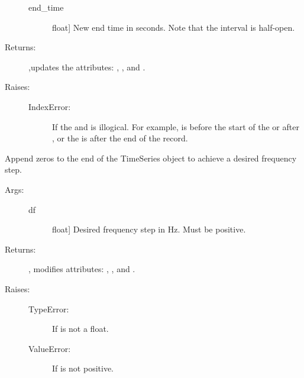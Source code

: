 \documentclass[letterpaper,10pt,english]{sphinxmanual}
\begin{document}
\begin{fulllineitems}
\begin{fulllineitems}
\begin{description}
\begin{description}
\item[{end\_time}] \leavevmode{[}float{]}
New end time in seconds. Note that the interval is
half-open.

\end{description}

\item[{Returns:}] \leavevmode
{},updates the attributes: , , and
.

\item[{Raises:}] \leavevmode\begin{description}
\item[{IndexError:}] \leavevmode
If the  and  is illogical.
For example,  is before the start of the
 or after , or the  is
after the end of the record.

\end{description}

\end{description}

\end{fulllineitems}


\begin{fulllineitems}
\label{\detokenize{index:sigpropy.TimeSeries.zero_pad}}
Append zeros to the end of the TimeSeries object to achieve a
desired frequency step.
\begin{description}
\item[{Args:}] \leavevmode\begin{description}
\item[{df}] \leavevmode{[}float{]}
Desired frequency step in Hz. Must be positive.

\end{description}

\item[{Returns:}] \leavevmode
{}, modifies attributes: , , and
.

\item[{Raises:}] \leavevmode\begin{description}
\item[{TypeError:}] \leavevmode
If  is not a float.

\item[{ValueError:}] \leavevmode
If  is not positive.

\end{description}

\end{description}

\end{fulllineitems}


\end{fulllineitems}
\end{document}
